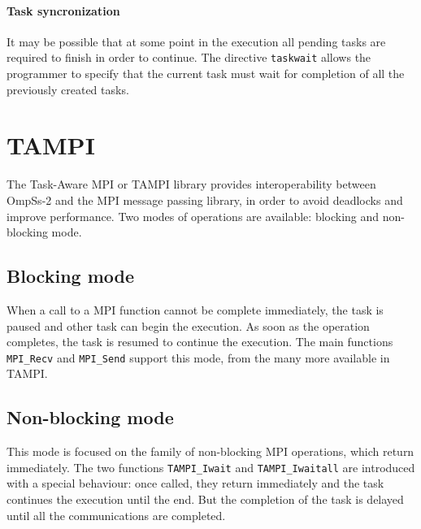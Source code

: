 \paragraph{Task syncronization} It may be possible that at some point in the
execution all pending tasks are required to finish in order to continue. The
directive \texttt{taskwait} allows the programmer to specify that the current 
task must wait for completion of all the previously created tasks.

\section{TAMPI}

The Task-Aware MPI or TAMPI library provides interoperability between OmpSs-2 
and the MPI message passing library, in order to avoid deadlocks and improve 
performance. Two modes of operations are available: blocking and non-blocking 
mode.

\subsection{Blocking mode}

When a call to a MPI function cannot be complete immediately, the task is paused 
and other task can begin the execution. As soon as the operation completes, the 
task is resumed to continue the execution. The main functions \texttt{MPI\_Recv} 
and \texttt{MPI\_Send} support this mode, from the many more available in TAMPI.  

\subsection{Non-blocking mode}

This mode is focused on the family of non-blocking MPI operations, which return 
immediately. The two functions \texttt{TAMPI\_Iwait} and 
\texttt{TAMPI\_Iwaitall} are introduced with a special behaviour: once called, 
they return immediately and the task continues the execution until the end. But 
the completion of the task is delayed until all the communications are 
completed.


